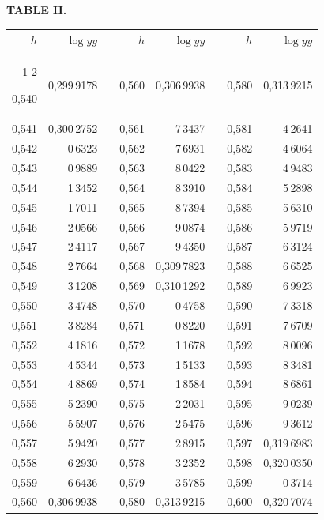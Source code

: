 \endgroup
\clearpage
{}
\begingroup
\centering
\fontsize{9}{9}\selectfont
\setlength{\tabcolsep}{8pt}
\renewcommand{\arraystretch}{1}
\setlength{\parskip}{0pt}
\textbf{TABLE II.}
\par\vspace{7pt}
\begin{tabular}{|r|r|@{}p{9pt}@{}|r|r|@{}p{9pt}@{}|r|r|}
\hline
\rule{0pt}{8.5pt}\(h\) & \(\log yy\) & & \(h\) & \(\log yy\) & & \(h\) & \(\log yy\) \\
\cline{1-2}\cline{4-5}\cline{7-8}
\rule{0pt}{8.5pt}0,540 & 0,299\,9178 &  & 0,560 & 0,306\,9938 &  & 0,580 & 0,313\,9215 \\
0,541 & 0,300\,2752 &  & 0,561 & 7\,3437 &  & 0,581 & 4\,2641 \\
0,542 & 0\,6323 &  & 0,562 & 7\,6931 &  & 0,582 & 4\,6064 \\
0,543 & 0\,9889 &  & 0,563 & 8\,0422 &  & 0,583 & 4\,9483 \\
0,544 & 1\,3452 &  & 0,564 & 8\,3910 &  & 0,584 & 5\,2898 \\
0,545 & 1\,7011 &  & 0,565 & 8\,7394 &  & 0,585 & 5\,6310 \\[3pt]
0,546 & 2\,0566 &  & 0,566 & 9\,0874 &  & 0,586 & 5\,9719 \\
0,547 & 2\,4117 &  & 0,567 & 9\,4350 &  & 0,587 & 6\,3124 \\
0,548 & 2\,7664 &  & 0,568 & 0,309\,7823 &  & 0,588 & 6\,6525 \\
0,549 & 3\,1208 &  & 0,569 & 0,310\,1292 &  & 0,589 & 6\,9923 \\
0,550 & 3\,4748 &  & 0,570 & 0\,4758 &  & 0,590 & 7\,3318 \\[3pt]
0,551 & 3\,8284 &  & 0,571 & 0\,8220 &  & 0,591 & 7\,6709 \\
0,552 & 4\,1816 &  & 0,572 & 1\,1678 &  & 0,592 & 8\,0096 \\
0,553 & 4\,5344 &  & 0,573 & 1\,5133 &  & 0,593 & 8\,3481 \\
0,554 & 4\,8869 &  & 0,574 & 1\,8584 &  & 0,594 & 8\,6861 \\
0,555 & 5\,2390 &  & 0,575 & 2\,2031 &  & 0,595 & 9\,0239 \\[3pt]
0,556 & 5\,5907 &  & 0,576 & 2\,5475 &  & 0,596 & 9\,3612 \\
0,557 & 5\,9420 &  & 0,577 & 2\,8915 &  & 0,597 & 0,319\,6983 \\
0,558 & 6\,2930 &  & 0,578 & 3\,2352 &  & 0,598 & 0,320\,0350 \\
0,559 & 6\,6436 &  & 0,579 & 3\,5785 &  & 0,599 & 0\,3714\rlap{\hspace{.36em}\raisebox{.85ex}{.}} \\
0,560 & 0,306\,9938 &  & 0,580 & 0,313\,9215 &  & 0,600 & 0,320\,7074 \\
\hline
\end{tabular}\par
\endgroup
